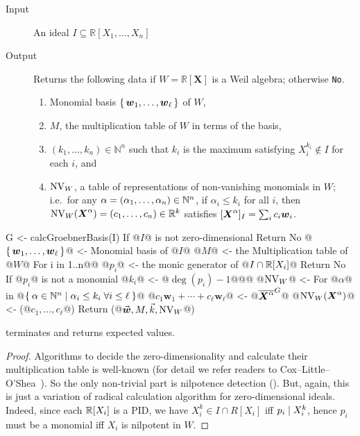\documentclass[%
  sigconf,authorversion,screen]{acmart}
\begin{document}
\begin{algorithm}\label{alg:weil-test}
  \hspace{1em}\vspace{-.5em}
  \begin{description}
    \item[Input] An ideal $I \subseteq \mathbb{R}[X_1, \dots, X_n]$
    \item[Output] Returns the following data if $W = \mathbb{R}[\boldsymbol{X}]$ is a Weil algebra; otherwise \verb|No|.
    \begin{enumerate}
      \item Monomial basis $\set{\boldsymbol{w}_1, \dots, \boldsymbol{w}_\ell}$ of $W$,
      \item $M$, the multiplication table of $W$ in terms of the basis,
      \item $(k_1, \dots, k_n) \in \mathbb{N}^n$ such that $k_i$ is the maximum satisfying $X_i^{k_i} \notin I$ for each $i$, and
      \item $\operatorname{NV}_W$, a table of representations of non-vanishing monomials in $W$;
      i.e.\ for any $\alpha = (\alpha_1, \dots, \alpha_n) \in \mathbb{N}^n$, if $\alpha_i \leq k_i$ for all $i$, then $\operatorname{NV}_W(\boldsymbol{X}^\alpha) = (c_1, \dots, c_n) \in \mathbb{R}^k$ satisfies $[\boldsymbol{X}^\alpha]_I = \sum_i c_i \boldsymbol{w}_i$.
    \end{enumerate} 
  \end{description}

  \begin{alg}
G <- calcGroebnerBasis(I)
If @$I$@ is not zero-dimensional
  Return No
@$\set{\boldsymbol{w}_1, \dots, \boldsymbol{w}_\ell}$@ <- Monomial basis of @$I$@
@$M$@ <- the Multiplication table of @$W$@
For i in 1..n@\label{line:weil-test:radical-start}@
  @$p_i$@ <- the monic generator of @$I \cap \mathbb{R}[X_i]$@
  Return No If @$p_i$@ is not a monomial
  @$k_i$@ <- @$\deg(p_i) - 1$@@\label{line:weil-test:radical-end}@
@$\operatorname{NV}_W$@ <- {}
For @$\alpha$@ in @$\Set{\alpha \in \mathbb{N}^n | \alpha_i \leq k_i \; \forall i \leq \ell}$@
  @$c_1 \boldsymbol{w}_1 + \cdots + c_\ell \boldsymbol{w}_\ell$@ <- @${\overline{\boldsymbol{X}^\alpha}}^{G}$@
  @$\operatorname{NV}_W(\boldsymbol{X}^\alpha)$@ <- (@$c_1, \dots, c_\ell$@)
Return (@$\vec{\boldsymbol{w}}, M, \vec{k}, \operatorname{NV}_W$@)
\end{alg}
\end{algorithm}

\begin{theorem}
   terminates and returns expected values.
\end{theorem}
\begin{proof}
  Algorithms to decide the zero-dimensionality and calculate their multiplication table is well-known (for detail we refer readers to Cox--Little--O'Shea~\cite[Chapter 2]{CLO:2005}).
  So the only non-trivial part is nilpotence detection ().
  But, again, this is just a variation of radical calculation algorithm for zero-dimensional ideals.
  Indeed, since each $\mathbb{R}[X_i]$ is a PID, we have $X_i^k \in I \cap R[X_i]$ iff $p_i \mathrel{\mid} X_i^k$, hence $p_i$ must be a monomial iff $X_i$ is nilpotent in $W$.
\end{proof}
\end{document}
